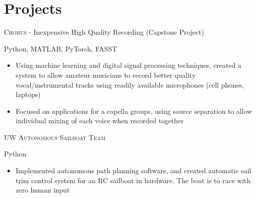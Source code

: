 \documentclass[a4paper,10pt]{article}
\begin{document}
\begin{minipage}[t]{0.60\textwidth}
\section{Projects}
\smallskip
\begin{large}
\textsc{Chorus} - Inexpensive High Quality Recording (Capstone Project) \\
\end{large}
\begin{footnotesize}
Python, MATLAB, PyTorch, FASST
\end{footnotesize}
\smallskip
\begin{itemize}
	\item {Using machine learning and digital signal processing techniques, created a system to allow amateur musicians to record better quality vocal/instrumental tracks using readily available microphones (cell phones, laptops)}
    \item {Focused on applications for a capella groups, using source separation to allow individual mixing of each voice when recorded together}
\end{itemize}

\bigskip

\begin{large}
\textsc{UW Autonomous Sailboat Team}\\
\end{large}
\begin{footnotesize}
Python
\end{footnotesize}
\smallskip
\begin{itemize}
	\item {Implemented autonomous path planning software, and created automatic sail trim control system for an RC sailboat in hardware. The boat is to race with zero human input}
\end{itemize}


\end{minipage}
\hfill
\end{document}
